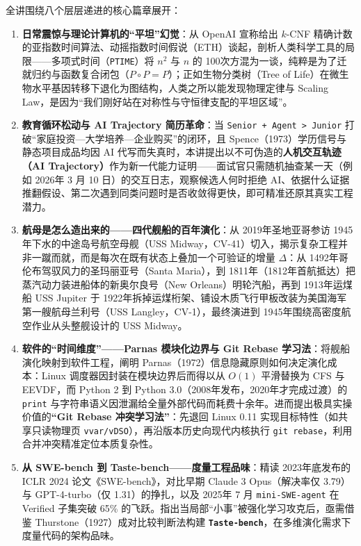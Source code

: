 \documentclass[a4paper]{article}
\begin{document}
全讲围绕八个层层递进的核心篇章展开：
\begin{enumerate}
    \item \textbf{日常震惊与理论计算机的“平坦”幻觉}：从 OpenAI 宣称给出 $k$-CNF 精确计数的亚指数时间算法、动摇指数时间假说（ETH）谈起，剖析人类科学工具的局限——多项式时间（\texttt{PTIME}）将 $n^2$ 与 $n$ 的 100次方混为一谈，纯粹是为了迁就归约与函数复合闭包（$P \circ P = P$）；正如生物分类树（Tree of Life）在微生物水平基因转移下退化为图结构，人类之所以能发现物理定律与 Scaling Law，是因为“我们刚好站在对称性与守恒律支配的平坦区域”。
    \item \textbf{教育循环松动与 AI Trajectory 简历革命}：当 \texttt{Senior + Agent > Junior} 打破“家庭投资—大学培养—企业购买”的闭环，且 Spence（1973）学历信号与静态项目成品均因 AI 代写而失真时，本讲提出以不可伪造的\textbf{人机交互轨迹（AI Trajectory）}作为新一代能力证明——面试官只需随机抽查某一天（例如 2026年 3 月 10 日）的交互日志，观察候选人何时拒绝 AI、依据什么证据推翻假设、第二次遇到同类问题时是否收敛得更快，即可精准还原其真实工程潜力。
    \item \textbf{航母是怎么造出来的——四代舰船的百年演化}：从 2019年圣地亚哥参访 1945年下水的中途岛号航空母舰（USS Midway，CV-41）切入，揭示复杂工程并非一蹴而就，而是每次在既有状态上叠加一个可验证的增量 $\Delta$：从 1492年哥伦布驾驭风力的圣玛丽亚号（Santa Maria），到 1811年（1812年首航抵达）把蒸汽动力装进船体的新奥尔良号（New Orleans）明轮汽船，再到 1913年运煤船 USS Jupiter 于 1922年拆掉运煤桁架、铺设木质飞行甲板改装为美国海军第一艘航母兰利号（USS Langley，CV-1），最终演进到 1945年围绕高密度航空作业从头整舰设计的 USS Midway。
    \item \textbf{软件的“时间维度”——Parnas 模块化边界与 Git Rebase 学习法}：将舰船演化映射到软件工程，阐明 Parnas（1972）信息隐藏原则如何决定演化成本：Linux 调度器因封装在模块边界后而得以从 $O(1)$ 平滑替换为 CFS 与 EEVDF，而 Python 2 到 Python 3.0（2008年发布，2020年才完成过渡）的 \texttt{print} 与字符串语义因泄漏给全量外部代码而耗费十余年。进而提出极具实操价值的\textbf{“Git Rebase 冲突学习法”}：先退回 Linux 0.11 实现目标特性（如共享只读物理页 \texttt{vvar/vDSO}），再沿版本历史向现代内核执行 \texttt{git rebase}，利用合并冲突精准定位本质复杂性。
    \item \textbf{从 SWE-bench 到 Taste-bench——度量工程品味}：精读 2023年底发布的 ICLR 2024 论文《SWE-bench》，对比早期 Claude 3 Opus（解决率仅 3.79）与 GPT-4-turbo（仅 1.31）的挣扎，以及 2025年 7 月 \texttt{mini-SWE-agent} 在 Verified 子集突破 65\% 的飞跃。指出当局部“小事”被强化学习攻克后，亟需借鉴 Thurstone（1927）成对比较判断法构建 \textbf{\texttt{Taste-bench}}，在多维演化需求下度量代码的架构品味。

\end{enumerate}
\end{document}
